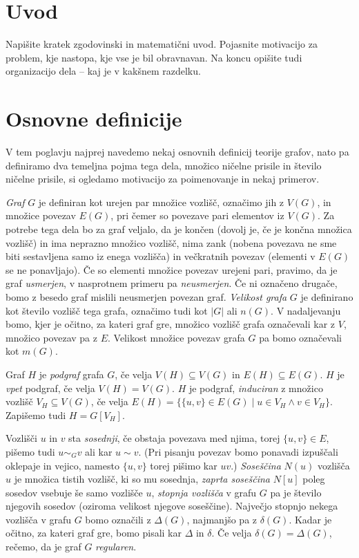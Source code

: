 \documentclass[12pt,a4paper,twoside]{article}
\theoremstyle{definition} %
\theoremstyle{plain} %
\numberwithin{equation}{section}  %
\begin{document}
\section{Uvod}
Napišite kratek zgodovinski in matematični uvod.  Pojasnite motivacijo za problem, kje
nastopa, kje vse je bil obravnavan. Na koncu opišite tudi organizacijo dela -- kaj je v kakšnem
razdelku.

\section{Osnovne definicije}
V tem poglavju najprej navedemo nekaj osnovnih definicij teorije grafov, nato pa definiramo dva temeljna pojma tega dela, množico ničelne prisile in število ničelne prisile, si ogledamo motivacijo za poimenovanje in nekaj primerov.

\emph{Graf} $G$ je definiran kot urejen par množice vozlišč, označimo jih z $V(G)$, in množice povezav $E(G)$, pri čemer so povezave pari elementov iz $V(G)$. Za potrebe tega dela bo za graf veljalo, da je končen (dovolj je, če je končna množica vozlišč) in ima neprazno množico vozlišč, nima zank (nobena povezava ne sme biti sestavljena samo iz enega vozlišča) in večkratnih povezav (elementi v $E(G)$ se ne ponavljajo). Če so elementi množice povezav urejeni pari, pravimo, da je graf \emph{usmerjen}, v nasprotnem primeru pa \emph{neusmerjen}. Če ni označeno drugače, bomo z besedo graf mislili neusmerjen povezan graf. \emph{Velikost grafa} $G$ je definirano kot število vozlišč tega grafa, označimo tudi kot $|G|$ ali $n(G)$. V nadaljevanju bomo, kjer je očitno, za kateri graf gre, množico vozlišč grafa označevali kar z $V$, množico povezav pa z $E$. Velikost množice povezav grafa $G$ pa bomo označevali kot $m(G)$.

Graf $H$ je \emph{podgraf} grafa $G$, če velja $V(H) \subseteq V(G)$ in $E(H) \subseteq E(G)$. $H$ je \emph{vpet} podgraf, če velja $V(H) = V(G)$. $H$ je podgraf, \emph{induciran} z množico vozlišč $V_H \subseteq V(G)$, če velja $E(H) = \{ \{ u,v \} \in E(G) \mid u \in V_H \land v \in V_H \}$. Zapišemo tudi $H = G[V_H]$.

Vozlišči $u$ in $v$ sta \emph{sosednji}, če obstaja povezava med njima, torej $\{u,v\} \in E$, pišemo tudi $u \sim_G v$ ali kar $u \sim v$. (Pri pisanju povezav bomo ponavadi izpuščali oklepaje in vejico, namesto $\{u,v\}$ torej pišimo kar $uv$.) \emph{Soseščina} $N(u)$ vozlišča $u$ je množica tistih vozlišč, ki so mu sosednja, \emph{zaprta soseščina} $N[u]$ poleg sosedov vsebuje še samo vozlišče $u$, \emph{stopnja vozlišča} v grafu $G$ pa je število njegovih sosedov (oziroma velikost njegove soseščine). Največjo stopnjo nekega vozlišča v grafu $G$ bomo označili z $\Delta(G)$, najmanjšo pa z $\delta(G)$. Kadar je očitno, za kateri graf gre, bomo pisali kar $\Delta$ in $\delta$. Če velja $\delta(G) = \Delta(G)$, rečemo, da je graf $G$ \emph{regularen}.
\end{document}
